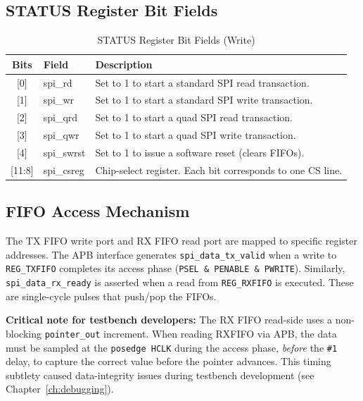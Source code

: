 \subsection{STATUS Register Bit Fields}

\begin{table}[H]
\centering
\caption{STATUS Register Bit Fields (Write)}
\label{tab:status_write}
\small
\begin{tabularx}{\textwidth}{@{}clX@{}}
\toprule
\textbf{Bits} & \textbf{Field} & \textbf{Description} \\
\midrule
{[0]}     & spi\_rd    & Set to 1 to start a standard SPI read transaction. \\
{[1]}     & spi\_wr    & Set to 1 to start a standard SPI write transaction. \\
{[2]}     & spi\_qrd   & Set to 1 to start a quad SPI read transaction. \\
{[3]}     & spi\_qwr   & Set to 1 to start a quad SPI write transaction. \\
{[4]}     & spi\_swrst & Set to 1 to issue a software reset (clears FIFOs). \\
{[11:8]}  & spi\_csreg & Chip-select register. Each bit corresponds to one CS line. \\
\bottomrule
\end{tabularx}
\end{table}

\subsection{FIFO Access Mechanism}

The TX FIFO write port and RX FIFO read port are mapped to specific register addresses. The APB
interface generates \texttt{spi\_data\_tx\_valid} when a write to \texttt{REG\_TXFIFO} completes
its access phase (\texttt{PSEL \& PENABLE \& PWRITE}). Similarly, \texttt{spi\_data\_rx\_ready}
is asserted when a read from \texttt{REG\_RXFIFO} is executed. These are single-cycle pulses that
push/pop the FIFOs.

\textbf{Critical note for testbench developers:} The RX FIFO read-side uses a non-blocking
\texttt{pointer\_out} increment. When reading RXFIFO via APB, the data must be sampled at the
\texttt{posedge HCLK} during the access phase, \emph{before} the \texttt{\#1} delay, to capture
the correct value before the pointer advances. This timing subtlety caused data-integrity issues
during testbench development (see Chapter~\ref{ch:debugging}).

